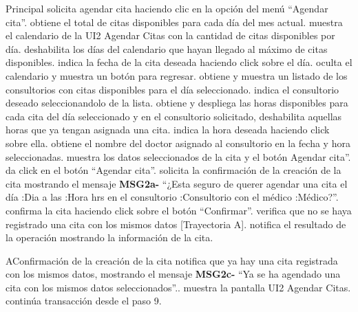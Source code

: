 \begin{UCtrayectoria}{Principal}
  \UCpaso[\UCactor] solicita agendar cita haciendo clic en la opción del menú “Agendar cita”.
  \UCpaso obtiene el total de citas disponibles para cada día del mes actual.
  \UCpaso muestra el calendario de la UI2 Agendar Citas con la cantidad de citas disponibles por día.
  \UCpaso deshabilita los días del calendario que hayan llegado al máximo de citas disponibles.
  \UCpaso[\UCactor] indica la fecha de la cita deseada haciendo click sobre el día.
  \UCpaso oculta el calendario y muestra un botón para regresar.
  \UCpaso obtiene y muestra un listado de los consultorios con citas disponibles para el día seleccionado.
  \UCpaso[\UCactor] indica el consultorio deseado seleccionandolo de la lista.
  \UCpaso obtiene y despliega las horas disponibles para cada cita del día seleccionado y en el consultorio solicitado, 
  \UCpaso deshabilita aquellas horas que ya tengan asignada una cita.
  \UCpaso[\UCactor] indica la hora deseada haciendo click sobre ella.
  \UCpaso obtiene el nombre del doctor asignado al consultorio en la fecha y hora seleccionadas.
  \UCpaso muestra los datos seleccionados de la cita y el botón Agendar cita”.
  \UCpaso[\UCactor] da click en el botón “Agendar cita”.
  \UCpaso solicita la confirmación de la creación de la cita mostrando el mensaje {\bf MSG2a-} “¿Esta seguro de querer agendar una cita el día :Dia a las :Hora hrs en el consultorio :Consultorio con el médico :Médico?”.
  \UCpaso[\UCactor] confirma la cita haciendo click sobre el botón “Confirmar”.
  \UCpaso verifica que no se haya registrado una cita con los mismos datos [Trayectoria A].
  \UCpaso notifica el resultado de la operación mostrando la información de la cita.
\end{UCtrayectoria}

\begin{UCtrayectoriaA}{A}{Confirmación de la creación de la cita}
  \UCpaso notifica que ya hay una cita registrada con los mismos datos, mostrando el mensaje {\bf MSG2c-} “Ya se ha agendado una cita con los mismos datos seleccionados”..
  \UCpaso muestra la pantalla UI2 Agendar Citas.
  \UCpaso continúa transacción desde el paso 9.
\end{UCtrayectoriaA}
